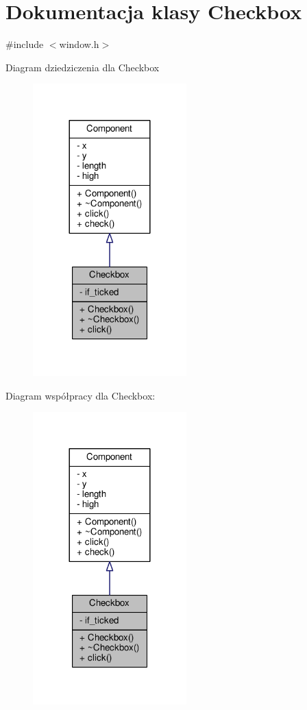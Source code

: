 \hypertarget{classCheckbox}{}\section{Dokumentacja klasy Checkbox}
\label{classCheckbox}


{\ttfamily \#include $<$window.\+h$>$}



Diagram dziedziczenia dla Checkbox
\nopagebreak
\begin{figure}[H]
\begin{center}
\leavevmode
\includegraphics[width=168pt]{classCheckbox__inherit__graph}
\end{center}
\end{figure}


Diagram współpracy dla Checkbox\+:
\nopagebreak
\begin{figure}[H]
\begin{center}
\leavevmode
\includegraphics[width=168pt]{classCheckbox__coll__graph}
\end{center}
\end{figure}
